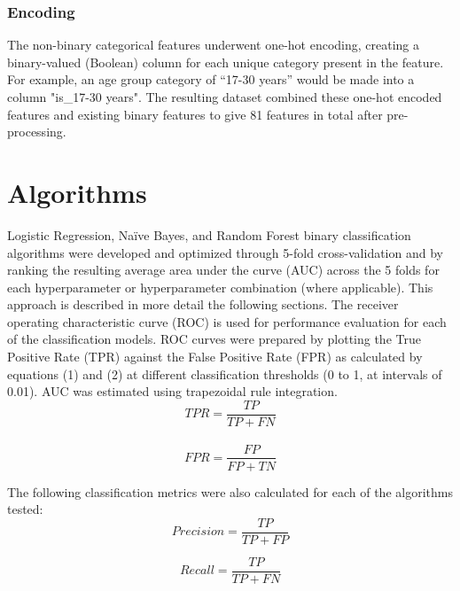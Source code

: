 \documentclass[11pt]{article}
\begin{document}
\subsubsection{Encoding}

The non-binary categorical features underwent one-hot encoding, creating a binary-valued (Boolean) column for each unique category present in the feature. For example, an age group category of “17-30 years” would be made into a column "is\_17-30 years". The resulting dataset combined these one-hot encoded features and existing binary features to give 81 features in total after pre-processing. 

\section{Algorithms}
\label{SS:4}

Logistic Regression, Naïve Bayes, and Random Forest binary classification algorithms were developed and optimized through 5-fold cross-validation and by ranking the resulting average area under the curve (AUC) across the 5 folds for each hyperparameter or hyperparameter combination (where applicable). This approach is described in more detail the following sections. The receiver operating characteristic curve (ROC) is used for performance evaluation for each of the classification models. ROC curves were prepared by plotting the True Positive Rate (TPR) against the False Positive Rate (FPR) as calculated by equations (1) and (2) at different classification thresholds (0 to 1, at intervals of 0.01). AUC was estimated using trapezoidal rule integration. \\

\begin{equation}
TPR = \frac{TP}{TP+FN}
\label{eqB}
\end{equation}
     \\

\begin{equation}
FPR = \frac{FP}{FP+TN}
\label{eqB}
\end{equation}

\indent  
The following classification metrics were also calculated for each of the algorithms tested:\\

\begin{equation}
Precision = \frac{TP}{TP+FP}
\label{eqB}
\end{equation}

\begin{equation}
Recall = \frac{TP}{TP+FN}
\label{eqB}
\end{equation}
\end{document}

